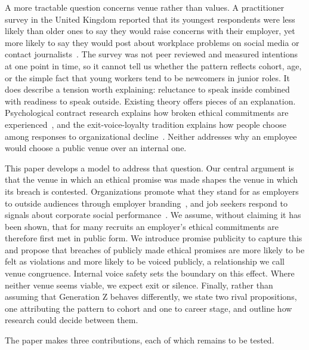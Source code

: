 A more tractable question concerns venue rather than values. A practitioner survey in the United Kingdom reported that its youngest respondents were less likely than older ones to say they would raise concerns with their employer, yet more likely to say they would post about workplace problems on social media or contact journalists~\citep{protect2025talkin}. The survey was not peer reviewed and measured intentions at one point in time, so it cannot tell us whether the pattern reflects cohort, age, or the simple fact that young workers tend to be newcomers in junior roles. It does describe a tension worth explaining: reluctance to speak inside combined with readiness to speak outside. Existing theory offers pieces of an explanation. Psychological contract research explains how broken ethical commitments are experienced~\citep{thompson2003violations}, and the exit-voice-loyalty tradition explains how people choose among responses to organizational decline~\citep{hirschman1970exit,turnley1999impact}. Neither addresses why an employee would choose a public venue over an internal one.

This paper develops a model to address that question. Our central argument is that the venue in which an ethical promise was made shapes the venue in which its breach is contested. Organizations promote what they stand for as employers to outside audiences through employer branding~\citep{backhaus2004conceptualizing}, and job seekers respond to signals about corporate social performance~\citep{jones2014why}. We assume, without claiming it has been shown, that for many recruits an employer's ethical commitments are therefore first met in public form. We introduce promise publicity to capture this and propose that breaches of publicly made ethical promises are more likely to be felt as violations and more likely to be voiced publicly, a relationship we call venue congruence. Internal voice safety sets the boundary on this effect. Where neither venue seems viable, we expect exit or silence. Finally, rather than assuming that Generation Z behaves differently, we state two rival propositions, one attributing the pattern to cohort and one to career stage, and outline how research could decide between them.

The paper makes three contributions, each of which remains to be tested.

